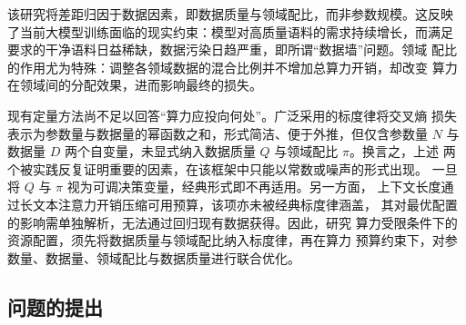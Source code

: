 \documentclass[bwprint]{gmcmthesis}
\numberwithin{equation}{section}
\numberwithin{figure}{section}
\numberwithin{table}{section}
\begin{document}
该研究将差距归因于数据因素，即数据质量与领域配比，而非参数规模。这反映
了当前大模型训练面临的现实约束：模型对高质量语料的需求持续增长，而满足
要求的干净语料日益稀缺，数据污染日趋严重，即所谓“数据墙”问题。领域
配比的作用尤为特殊：调整各领域数据的混合比例并不增加总算力开销，却改变
算力在领域间的分配效果，进而影响最终的损失\cite{xia_regmix_2024}。

现有定量方法尚不足以回答“算力应投向何处”。广泛采用的标度律将交叉熵
损失表示为参数量与数据量的幂函数之和，形式简洁、便于外推，但仅含参数量
$N$ 与数据量 $D$ 两个自变量，未显式纳入数据质量 $Q$ 与领域配比
$\pi$\cite{hoffmann_training_2022,bahri_explaining_2024}。换言之，上述
两个被实践反复证明重要的因素，在该框架中只能以常数或噪声的形式出现。
一旦将 $Q$ 与 $\pi$ 视为可调决策变量，经典形式即不再适用。另一方面，
上下文长度通过长文本注意力开销压缩可用预算，该项亦未被经典标度律涵盖，
其对最优配置的影响需单独解析，无法通过回归现有数据获得。因此，研究
算力受限条件下的资源配置，须先将数据质量与领域配比纳入标度律，再在算力
预算约束下，对参数量、数据量、领域配比与数据质量进行联合优化。

%
%

\subsection{问题的提出}

\end{document}
